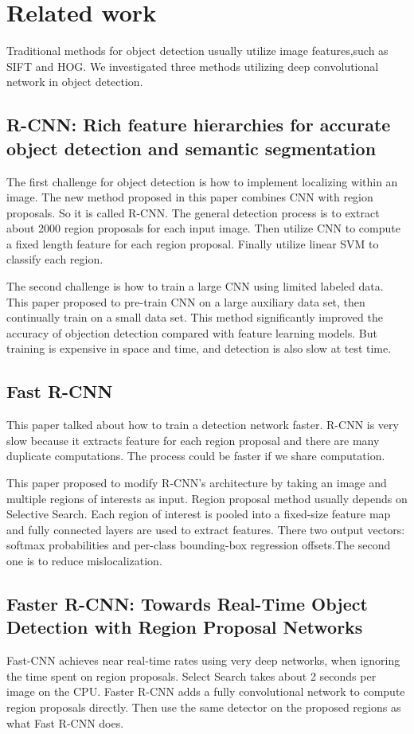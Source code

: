 
\section{Related work}
\label{others}
Traditional methods for object detection usually utilize image features,such as SIFT and HOG. We investigated three methods utilizing deep convolutional network in object detection.
\subsection{R-CNN: Rich feature hierarchies for accurate object detection and semantic segmentation}

 The first challenge for object detection is how to implement localizing within an image. The new method proposed in this paper\cite {rcnn} combines CNN with region proposals. So it is called R-CNN. The general detection process is to extract about 2000 region proposals for each input image. Then utilize CNN to compute a fixed length feature for each region proposal. Finally utilize linear SVM to classify each region. 


The second challenge is how to train a large CNN using limited labeled data. This paper proposed to pre-train CNN on a large auxiliary data set, then continually train on a small data set. This method significantly improved the accuracy of objection detection compared with feature learning models. But training is expensive in space and time, and detection is also slow at test time.

\subsection{Fast R-CNN}
This paper\cite {fast-rcnn} talked about how to train a detection network faster. R-CNN is very slow because it extracts feature for each region proposal and there are many duplicate computations. The process could be faster if we share computation. 

This paper proposed to modify R-CNN’s architecture by taking an image and multiple regions of interests as input. Region proposal method usually depends on Selective Search. Each region of interest is pooled into a fixed-size feature map and fully connected layers are used to extract features. There two output vectors: softmax probabilities and per-class bounding-box regression offsets.The second one is to reduce mislocalization.

\subsection{Faster R-CNN: Towards Real-Time Object Detection with Region Proposal Networks}
Fast-CNN achieves near real-time rates using very deep networks, when ignoring the time spent on region proposals. Select Search takes about 2 seconds per image on the CPU. Faster R-CNN\cite {faster-rcnn} adds a fully convolutional network to compute region proposals directly. Then use the same detector on the proposed regions as what Fast R-CNN does. 





